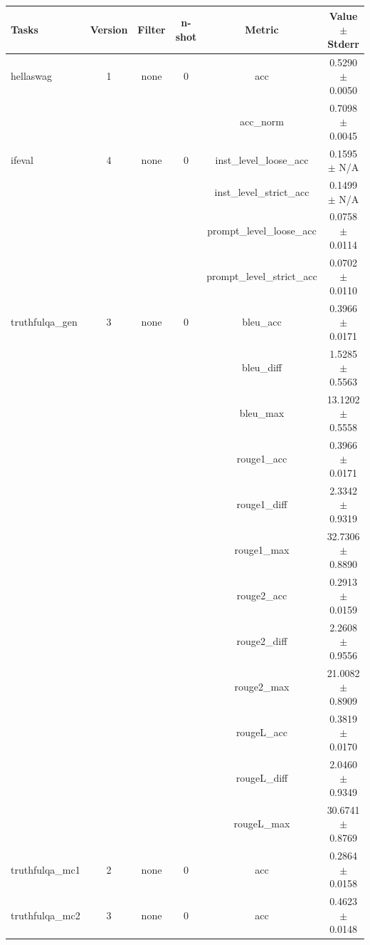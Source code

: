 \documentclass{ifacconf}
\begin{document}
\begin{strip}
\begin{minipage}{\textwidth}
			\begin{table}[H]
				\centering
				\begin{tabular}{|l|c|c|c|c|c|}
					\hline
					\textbf{Tasks} & \textbf{Version} & \textbf{Filter} & \textbf{n-shot} & \textbf{Metric} & \textbf{Value} $\pm$ \textbf{Stderr} \\ \hline
					hellaswag & 1 & none & 0 & acc & 0.5290 $\pm$ 0.0050 \\ \hline
					& & & & acc\_norm & 0.7098 $\pm$ 0.0045 \\ \hline
					ifeval & 4 & none & 0 & inst\_level\_loose\_acc & 0.1595 $\pm$ N/A \\ \hline
					& & & & inst\_level\_strict\_acc & 0.1499 $\pm$ N/A \\ \hline
					& & & & prompt\_level\_loose\_acc & 0.0758 $\pm$ 0.0114 \\ \hline
					& & & & prompt\_level\_strict\_acc & 0.0702 $\pm$ 0.0110 \\ \hline
					truthfulqa\_gen & 3 & none & 0 & bleu\_acc & 0.3966 $\pm$ 0.0171 \\ \hline
					& & & & bleu\_diff & 1.5285 $\pm$ 0.5563 \\ \hline
					& & & & bleu\_max & 13.1202 $\pm$ 0.5558 \\ \hline
					& & & & rouge1\_acc & 0.3966 $\pm$ 0.0171 \\ \hline
					& & & & rouge1\_diff & 2.3342 $\pm$ 0.9319 \\ \hline
					& & & & rouge1\_max & 32.7306 $\pm$ 0.8890 \\ \hline
					& & & & rouge2\_acc & 0.2913 $\pm$ 0.0159 \\ \hline
					& & & & rouge2\_diff & 2.2608 $\pm$ 0.9556 \\ \hline
					& & & & rouge2\_max & 21.0082 $\pm$ 0.8909 \\ \hline
					& & & & rougeL\_acc & 0.3819 $\pm$ 0.0170 \\ \hline
					& & & & rougeL\_diff & 2.0460 $\pm$ 0.9349 \\ \hline
					& & & & rougeL\_max & 30.6741 $\pm$ 0.8769 \\ \hline
					truthfulqa\_mc1 & 2 & none & 0 & acc & 0.2864 $\pm$ 0.0158 \\ \hline
					truthfulqa\_mc2 & 3 & none & 0 & acc & 0.4623 $\pm$ 0.0148 \\ \hline
				\end{tabular}
				\label{tab:llama31_q6k}
			\end{table}
		\end{minipage}
	\end{strip}
	
\end{document}
